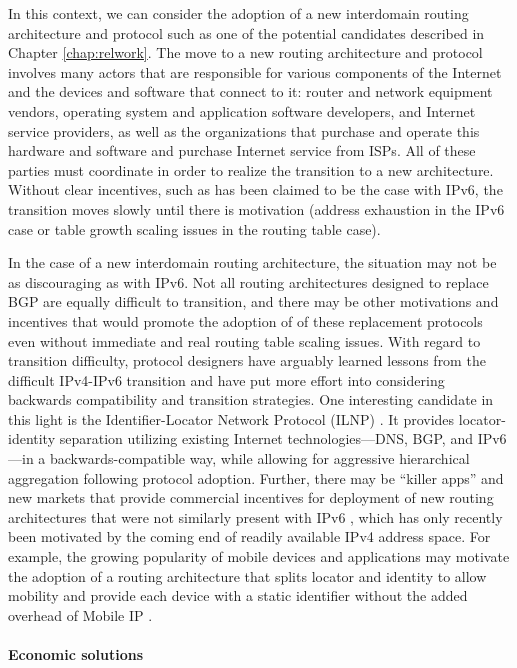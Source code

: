In this context, we can consider the adoption of a new interdomain routing
architecture and protocol such as one of the potential candidates described in
Chapter \ref{chap:relwork}. The move to a new routing architecture and protocol
involves many actors that are responsible for various components of the
Internet and the devices and software that connect to it: router and network
equipment vendors, operating system and application software developers, and
Internet service providers, as well as the organizations that purchase and
operate this hardware and software and purchase Internet service from ISPs. All
of these parties must coordinate in order to realize the transition to
a new architecture. Without clear incentives, such as has been claimed to be
the case with IPv6, the transition moves slowly until there is motivation
(address exhaustion in the IPv6 case or table growth scaling issues in the
routing table case).

In the case of a new interdomain routing architecture, the situation may not be
as discouraging as with IPv6. Not all routing architectures designed to replace
BGP are equally difficult to transition, and there may be other motivations and
incentives that would promote the adoption of of these replacement protocols
even without immediate and real routing table scaling issues. With regard to
transition difficulty, protocol designers have arguably learned lessons from
the difficult IPv4-IPv6 transition and have put more effort into considering
backwards compatibility and transition strategies. One interesting candidate in
this light is the Identifier-Locator Network Protocol (ILNP)
\cite{Atkinson:2010zr}.  It provides locator-identity separation utilizing
existing Internet technologies---DNS, BGP, and IPv6---in a backwards-compatible
way, while allowing for aggressive hierarchical aggregation following protocol
adoption. Further, there may be ``killer apps'' and new markets that provide
commercial incentives for deployment of new routing architectures that were not
similarly present with IPv6 \cite{Li:2011vn}, which has only recently been
motivated by the coming end of readily available IPv4 address space. For
example, the growing popularity of mobile devices and applications may motivate
the adoption of a routing architecture that splits locator and identity to
allow mobility and provide each device with a static identifier without the
added overhead of Mobile IP \cite{rfc3344}.


\paragraph{Economic solutions}

